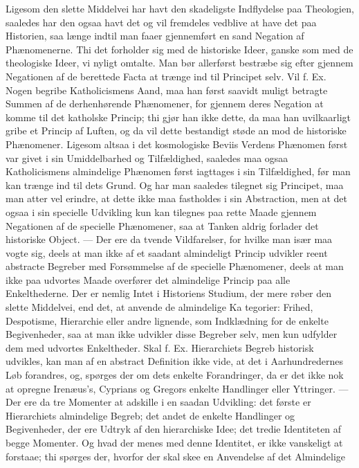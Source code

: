\documentclass[12pt]{book}
\newcommand{\opage}[1]{\marginnote{\footnotesize\textit{[#1]}}}
\begin{document}
Ligesom den slette Middelvei har havt den skadeligste Indflydelse paa
Theologien, saaledes har den ogsaa havt det og vil fremdeles vedblive at have
det paa Historien, saa længe indtil man faaer gjennemført en sand Negation af
Phænomenerne. Thi det forholder sig med de historiske Ideer, ganske som med de
theologiske Ideer, vi nyligt omtalte. Man bør allerførst bestræbe sig efter
gjennem Negationen af de berettede Facta at trænge ind til Principet selv. Vil
f. Ex. Nogen begribe Katholicismens Aand, maa han først saavidt muligt betragte
Summen af de derhenhørende Phænomener, for gjennem deres Negation at komme til
det katholske Princip; thi gjør han ikke dette, da maa han uvilkaarligt gribe et
Princip af Luften, og da vil dette bestandigt støde an mod de historiske
Phænomener. Ligesom altsaa i det kosmologiske Beviis Verdens Phænomen først var
givet i sin Umiddelbarhed og Tilfældighed, saaledes maa ogsaa Katholicismens
almindelige Phænomen først iagttages i sin Tilfældighed, før man kan trænge ind
til dets Grund. Og har man saaledes tilegnet sig Principet, maa man atter vel
erindre, at dette ikke maa fastholdes i sin Abstraction, men at det ogsaa i sin
specielle Udvikling kun kan tilegnes paa rette Maade gjennem Negationen af de
specielle Phænomener, saa at Tanken aldrig forlader det historiske Object. ---
Der ere da tvende Vildfarelser, for hvilke man især maa vogte sig, deels at man
ikke af et saadant almindeligt Princip udvikler reent abstracte Begreber med
Forsømmelse af de specielle Phænomener, deels at man ikke paa udvortes Maade
overfører det almindelige Princip paa alle Enkelthederne. Der er nemlig Intet i
Historiens Studium, der mere røber den slette Middelvei, end det, at anvende de
almindelige Ka%
\opage{24}tegorier: Frihed, Despotisme, Hierarchie eller andre lignende, som Indklædning
for de enkelte Begivenheder, saa at man ikke udvikler disse Begreber selv, men
kun udfylder dem med udvortes Enkeltheder. Skal f. Ex. Hierarchiets Begreb
historisk udvikles, kan man af en abstract Definition ikke vide, at det i
Aarhundredernes Løb forandres, og, spørges der om dets enkelte Forandringer, da
er det ikke nok at opregne Irenæus's, Cyprians og Gregors enkelte Handlinger
eller Yttringer. --- Der ere da tre Momenter at adskille i en saadan Udvikling:
det første er Hierarchiets almindelige Begreb; det andet de enkelte Handlinger
og Begivenheder, der ere Udtryk af den hierarchiske Idee; det tredie Identiteten
af begge Momenter. Og hvad der menes med denne Identitet, er ikke vanskeligt at
forstaae; thi spørges der, hvorfor der skal skee en Anvendelse af det Almindelige
\end{document}
